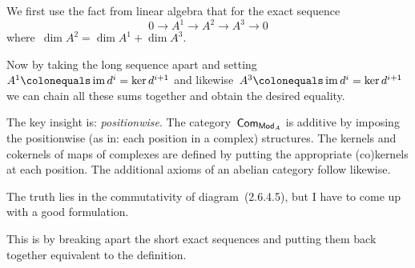\begin{exercise}
  We first use the fact from linear algebra that for the exact sequence
  \begin{equation}
    0\to A^1\to A^2\to A^3\to 0
  \end{equation}
  where~$\dim A^2=\dim A^1+\dim A^3$.

  Now by taking the long sequence apart and setting~$A^1\colonequals\image d^i=\ker d^{i+1}$ and likewise~$A^3\colonequals\image d^i=\ker d^{i+1}$ we can chain all these sums together and obtain the desired equality.
\end{exercise}

\begin{exercise}
  The key insight is: \emph{positionwise}. The category~$\mathsf{Com}_{\mathsf{Mod}_A}$ is additive by imposing the positionwise (as in: each position in a complex) structures. The kernels and cokernels of maps of complexes are defined by putting the appropriate (co)kernels at each position. The additional axioms of an abelian category follow likewise.
\end{exercise}

\begin{exercise}
  \label{exercise:26d}
  The truth lies in the commutativity of diagram~(2.6.4.5), but I have to come up with a good formulation.
\end{exercise}

\begin{exercise}
  This is by breaking apart the short exact sequences and putting them back together equivalent to the definition.
\end{exercise}

